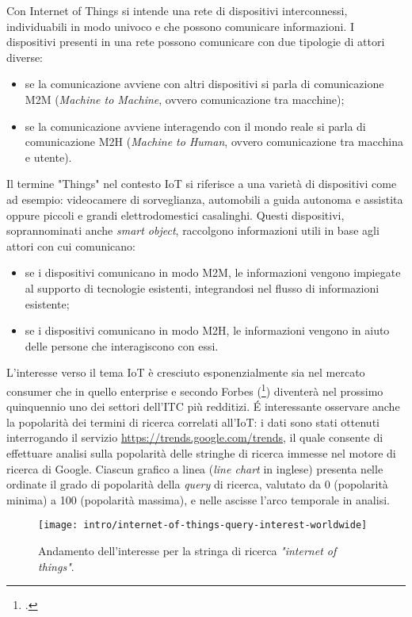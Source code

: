 Con Internet of Things si intende una rete di dispositivi interconnessi, individuabili in modo univoco e che possono comunicare informazioni.
I dispositivi presenti in una rete possono comunicare con due tipologie di attori diverse:
\begin{itemize}
  \item se la comunicazione avviene con altri dispositivi si parla di comunicazione M2M (\textit{Machine to Machine}, ovvero comunicazione tra macchine);
  \item se la comunicazione avviene interagendo con il mondo reale si parla di comunicazione M2H (\textit{Machine to Human}, ovvero comunicazione tra macchina e utente).
\end{itemize}

Il termine "Things" nel contesto IoT si riferisce a una varietà di dispositivi come ad esempio: videocamere di sorveglianza, automobili a guida autonoma e assistita oppure piccoli e grandi elettrodomestici casalinghi. Questi dispositivi, soprannominati anche \textit{smart object}, raccolgono informazioni utili in base agli attori con cui comunicano:
\begin{itemize}
  \item se i dispositivi comunicano in modo M2M, le informazioni vengono impiegate al supporto di tecnologie esistenti, integrandosi nel flusso di informazioni esistente; 
  \item se i dispositivi comunicano in modo M2H, le informazioni vengono in aiuto delle persone che interagiscono con essi.
\end{itemize}

L'interesse verso il tema IoT è cresciuto esponenzialmente sia nel mercato consumer che in quello enterprise e secondo Forbes (\footcite{site:forbes-iot}) diventerà nel prossimo quinquennio uno dei settori dell'ITC più redditizi.
É interessante osservare anche la popolarità dei termini di ricerca correlati all'IoT: i dati sono stati ottenuti interrogando il servizio \url{https://trends.google.com/trends}, il quale consente di effettuare analisi sulla popolarità delle stringhe di ricerca immesse nel motore di ricerca di Google.
Ciascun grafico a linea (\textit{line chart} in inglese) presenta nelle ordinate il grado di popolarità della \textit{query} di ricerca, valutato da 0 (popolarità minima) a 100 (popolarità massima), e nelle ascisse l'arco temporale in analisi. 

\begin{figure}[!ht]
    \centering
    \texttt{[image: intro/internet-of-things-query-interest-worldwide]}
    \caption{Andamento dell'interesse per la stringa di ricerca \textit{"internet of things"}. \\ \cite{site:iot-long-trend}}
    \label{fig:internet-of-things-query-interest}
\end{figure}

